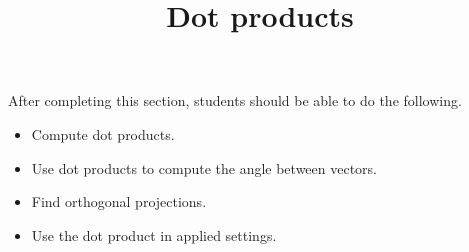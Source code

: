 \documentclass{ximera}
\title{Dot products}
\begin{document}
\begin{abstract}
\end{abstract}

\maketitle

\begin{sectionOutcomes}

After completing this section, students should be able to do the following.

\begin{itemize}
\item Compute dot products.
\item Use dot products to compute the angle between vectors.
\item Find orthogonal projections.
\item Use the dot product in applied settings. 
\end{itemize}

\end{sectionOutcomes}
\end{document}
